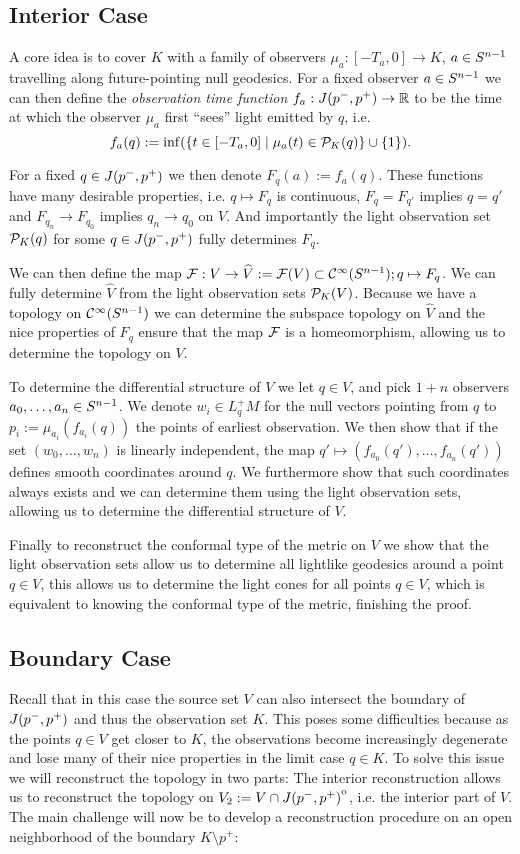 \subsection{Interior Case}
A core idea is to cover $K$ with a family of observers $\mu_a:[-T_a,0]\to K$, $a\in {S^{n-1}}$ travelling along future-pointing null geodesics. For a fixed observer $a\in {S^{n-1}}$ we can then define the \emph{observation time function} $f_a:J(p^-,p^+)\to \mathbb{R}$ to be the time at which the observer $\mu_a$ first \enquote{sees} light emitted by $q$, i.e. 
\[
    f_a(q):=\inf (\{t\in [-T_a,0] \mid \mu_a(t)\in {\mathcal{P}}_K(q)\}\cup \{1\}).
\]

For a fixed $q\in J(p^-,p^+)$ we then denote $F_q(a):=f_a(q)$. These functions have many desirable properties, i.e. $q\mapsto F_q$ is continuous, $F_q=F_{q'}$ implies $q=q'$ and $F_{q_n}\to F_{q_0}$ implies $q_n\to q_0$ on $V$.
And importantly the light observation set ${\mathcal{P}}_K(q)$ for some $q\in J(p^-,p^+)$ fully determines $F_q$. 

We can then define the map $\mathcal{F}:V\to \widehat{V}:=\mathcal{F}(V)\subset {\mathcal{C}}^\infty({S^{n-1}}); q\mapsto F_q$. We can fully determine $\widehat{V}$ from the light observation sets ${\mathcal{P}}_K(V)$. Because we have a topology on ${\mathcal{C}}^\infty({S^{n-1}})$ we can determine the subspace topology on $\widehat{V}$ and the nice properties of $F_q$ ensure that the map $\mathcal{F}$ is a homeomorphism, allowing us to determine the topology on $V$.

To determine the differential structure of $V$ we let $q\in V$, and pick $1+n$ observers $a_0,\dots,a_n\in {S^{n-1}}$. We denote $w_i\in L^+_qM$ for the null vectors pointing from $q$ to $p_i:=\mu_{a_i}(f_{a_i}(q))$ the points of earliest observation. We then show that if the set $(w_0,\dots, w_n)$ is linearly independent, the map $q'\mapsto (f_{a_0}(q'),\dots, f_{a_n}(q'))$ defines smooth coordinates around $q$. We furthermore show that such coordinates always exists and we can determine them using the light observation sets, allowing us to determine the differential structure of $V$.

Finally to reconstruct the conformal type of the metric on $V$ we show that the light observation sets allow us to determine all lightlike geodesics around a point $q\in V$, this allows us to determine the light cones for all points $q\in V$, which is equivalent to knowing the conformal type of the metric, finishing the proof.

\subsection{Boundary Case}
Recall that in this case the source set $V$ can also intersect the boundary of $J(p^-,p^+)$ and thus the observation set $K$. This poses some difficulties because as the points $q\in V$ get closer to $K$, the observations become increasingly degenerate and lose many of their nice properties in the limit case $q\in K$.
 To solve this issue we will reconstruct the topology in two parts: The interior reconstruction allows us to reconstruct the topology on $V_2:= V \cap {\kern0ptJ(p^-,p^+)}^{\mathrm{o}}$, i.e. the interior part of $V$. The main challenge will now be to develop a reconstruction procedure on an open neighborhood of the boundary $K\setminus p^+$:

